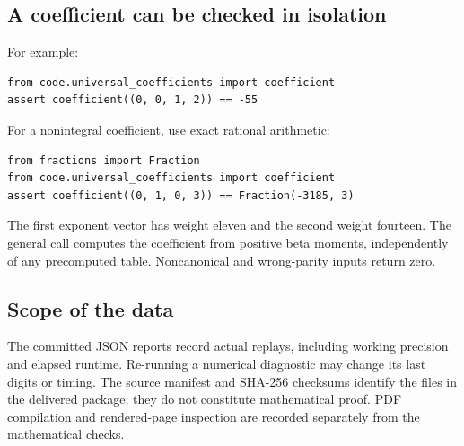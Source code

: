 \documentclass[11pt,letterpaper]{article}
\numberwithin{equation}{section}
\theoremstyle{plain}
\theoremstyle{definition}
\theoremstyle{remark}
\begin{document}
\subsection{A coefficient can be checked in isolation}

For example:
\begin{verbatim}
from code.universal_coefficients import coefficient
assert coefficient((0, 0, 1, 2)) == -55
\end{verbatim}
For a nonintegral coefficient, use exact rational arithmetic:
\begin{verbatim}
from fractions import Fraction
from code.universal_coefficients import coefficient
assert coefficient((0, 1, 0, 3)) == Fraction(-3185, 3)
\end{verbatim}
The first exponent vector has weight eleven and the second weight fourteen. The general call computes the coefficient from positive beta moments, independently of any precomputed table. Noncanonical and wrong-parity inputs return zero.

\subsection{Scope of the data}

The committed JSON reports record actual replays, including working precision and elapsed runtime. Re-running a numerical diagnostic may change its last digits or timing. The source manifest and SHA-256 checksums identify the files in the delivered package; they do not constitute mathematical proof. PDF compilation and rendered-page inspection are recorded separately from the mathematical checks.

\end{document}
